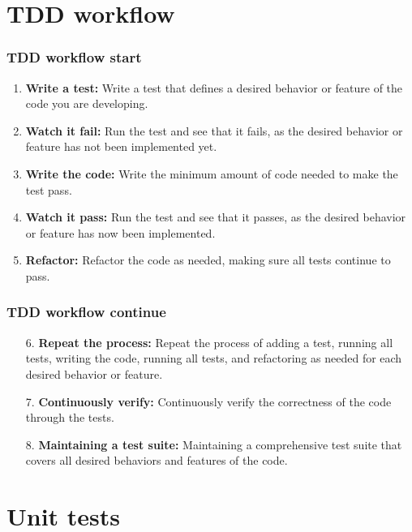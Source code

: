 \documentclass{beamer}
\begin{document}
\section{TDD workflow}

\begin{frame}
\frametitle{TDD workflow start}
\begin{enumerate}
\item \textbf{Write a test:} Write a test that defines a desired behavior or feature of the code you are developing.
\item \textbf{Watch it fail:} Run the test and see that it fails, as the desired behavior or feature has not been implemented yet.
\item \textbf{Write the code:} Write the minimum amount of code needed to make the test pass.
\item \textbf{Watch it pass:} Run the test and see that it passes, as the desired behavior or feature has now been implemented.
\item \textbf{Refactor:} Refactor the code as needed, making sure all tests continue to pass.
\end{enumerate}
\end{frame}

\begin{frame}
\frametitle{TDD workflow continue}
\begin{enumerate}
\item[6.] \textbf{Repeat the process:} Repeat the process of adding a test, running all tests, writing the code, running all tests, and refactoring as needed for each desired behavior or feature.
\item[7.] \textbf{Continuously verify:} Continuously verify the correctness of the code through the tests.
\item[8.] \textbf{Maintaining a test suite:} Maintaining a comprehensive test suite that covers all desired behaviors and features of the code.
\end{enumerate}
\end{frame}


\section{Unit tests}
\end{document}
